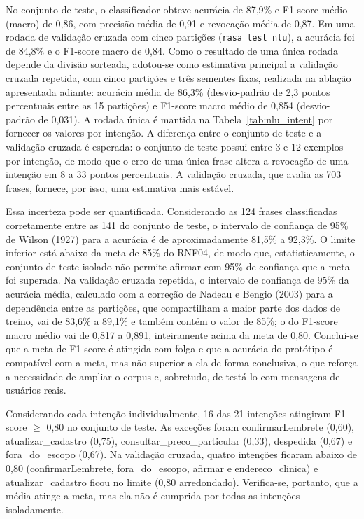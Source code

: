 \documentclass[12pt,a4paper]{extarticle}
\begin{document}
No conjunto de teste, o classificador obteve acurácia de 87,9\% e F1-score médio (macro) de 0,86, com precisão média de 0,91 e revocação média de 0,87. Em uma rodada de validação cruzada com cinco partições (\texttt{rasa test nlu}), a acurácia foi de 84,8\% e o F1-score macro de 0,84. Como o resultado de uma única rodada depende da divisão sorteada, adotou-se como estimativa principal a validação cruzada repetida, com cinco partições e três sementes fixas, realizada na ablação apresentada adiante: acurácia média de 86,3\% (desvio-padrão de 2,3 pontos percentuais entre as 15 partições) e F1-score macro médio de 0,854 (desvio-padrão de 0,031). A rodada única é mantida na Tabela~\ref{tab:nlu_intent} por fornecer os valores por intenção. A diferença entre o conjunto de teste e a validação cruzada é esperada: o conjunto de teste possui entre 3 e 12 exemplos por intenção, de modo que o erro de uma única frase altera a revocação de uma intenção em 8 a 33 pontos percentuais. A validação cruzada, que avalia as 703 frases, fornece, por isso, uma estimativa mais estável.

Essa incerteza pode ser quantificada. Considerando as 124 frases classificadas corretamente entre as 141 do conjunto de teste, o intervalo de confiança de 95\% de Wilson (1927) para a acurácia é de aproximadamente 81,5\% a 92,3\%. O limite inferior está abaixo da meta de 85\% do RNF04, de modo que, estatisticamente, o conjunto de teste isolado não permite afirmar com 95\% de confiança que a meta foi superada. Na validação cruzada repetida, o intervalo de confiança de 95\% da acurácia média, calculado com a correção de Nadeau e Bengio (2003) para a dependência entre as partições, que compartilham a maior parte dos dados de treino, vai de 83,6\% a 89,1\% e também contém o valor de 85\%; o do F1-score macro médio vai de 0,817 a 0,891, inteiramente acima da meta de 0,80. Conclui-se que a meta de F1-score é atingida com folga e que a acurácia do protótipo é compatível com a meta, mas não superior a ela de forma conclusiva, o que reforça a necessidade de ampliar o corpus e, sobretudo, de testá-lo com mensagens de usuários reais.

Considerando cada intenção individualmente, 16 das 21 intenções atingiram F1-score $\geq$ 0,80 no conjunto de teste. As exceções foram confirmarLembrete (0,60), atualizar\_\allowbreak{}cadastro (0,75), consultar\_\allowbreak{}preco\_\allowbreak{}particular (0,33), despedida (0,67) e fora\_\allowbreak{}do\_\allowbreak{}escopo (0,67). Na validação cruzada, quatro intenções ficaram abaixo de 0,80 (confirmarLembrete, fora\_\allowbreak{}do\_\allowbreak{}escopo, afirmar e endereco\_\allowbreak{}clinica) e atualizar\_\allowbreak{}cadastro ficou no limite (0,80 arredondado). Verifica-se, portanto, que a média atinge a meta, mas ela não é cumprida por todas as intenções isoladamente.
\end{document}
